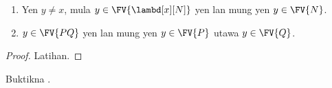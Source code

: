 \documentclass[../../../include/open-logic-section]{subfiles}
\begin{document}
\begin{lem}
  \begin{enumerate}
    \item {}
      Yen $y \neq x$, mula
      $y \in
      \FV{\lambd[x][N]}$ yen lan mung
      yen $y \in \FV{N}$.
    \item {}
      $y \in \FV{PQ}$ yen lan mung yen
      $y \in \FV{P}$ utawa
      $y \in \FV{Q}$.
  \end{enumerate}
\end{lem}

\begin{proof}
  Latihan.
\end{proof}

\begin{prob}
  Buktikna .
\end{prob}
\end{document}
